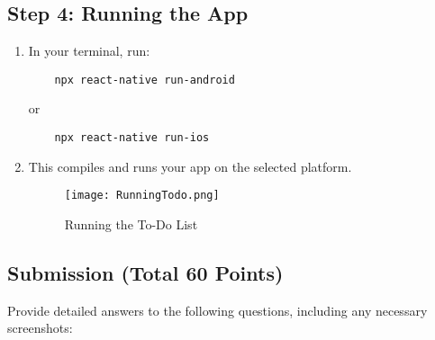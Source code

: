 \documentclass{article}
\begin{document}
\subsection{Step 4: Running the App}
\begin{enumerate}
    \item In your terminal, run:
    \begin{verbatim}
    npx react-native run-android
    \end{verbatim}
    or
    \begin{verbatim}
    npx react-native run-ios
    \end{verbatim}
    \item This compiles and runs your app on the selected platform.
    \begin{figure}[H]
        \centering
        \texttt{[image: RunningTodo.png]}
        \caption{Running the To-Do List}
    \end{figure}

\end{enumerate}

\subsection{Submission (Total 60 Points)}
Provide detailed answers to the following questions, including any necessary screenshots:
\end{document}
